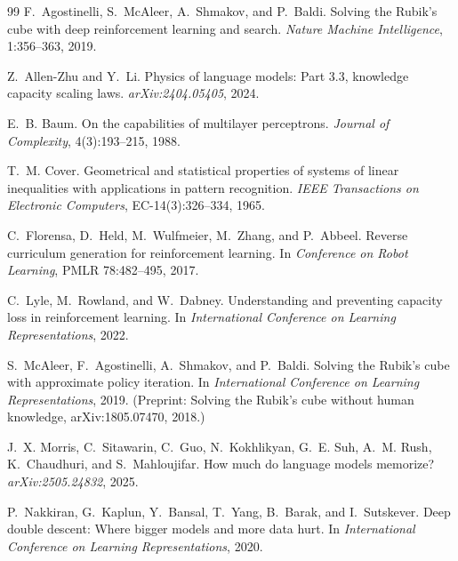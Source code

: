 \documentclass[11pt]{article}
\begin{document}

\begin{thebibliography}{99}
\providecommand{\natexlab}[1]{#1}
F.~Agostinelli, S.~McAleer, A.~Shmakov, and P.~Baldi.
\newblock Solving the Rubik's cube with deep reinforcement learning and search.
\newblock \emph{Nature Machine Intelligence}, 1:356--363, 2019.

Z.~Allen-Zhu and Y.~Li.
\newblock Physics of language models: Part 3.3, knowledge capacity scaling laws.
\newblock \emph{arXiv:2404.05405}, 2024.

E.~B. Baum.
\newblock On the capabilities of multilayer perceptrons.
\newblock \emph{Journal of Complexity}, 4(3):193--215, 1988.

T.~M. Cover.
\newblock Geometrical and statistical properties of systems of linear inequalities with applications in pattern recognition.
\newblock \emph{IEEE Transactions on Electronic Computers}, EC-14(3):326--334, 1965.

C.~Florensa, D.~Held, M.~Wulfmeier, M.~Zhang, and P.~Abbeel.
\newblock Reverse curriculum generation for reinforcement learning.
\newblock In \emph{Conference on Robot Learning}, PMLR 78:482--495, 2017.

C.~Lyle, M.~Rowland, and W.~Dabney.
\newblock Understanding and preventing capacity loss in reinforcement learning.
\newblock In \emph{International Conference on Learning Representations}, 2022.

S.~McAleer, F.~Agostinelli, A.~Shmakov, and P.~Baldi.
\newblock Solving the Rubik's cube with approximate policy iteration.
\newblock In \emph{International Conference on Learning Representations}, 2019. (Preprint: Solving the Rubik's cube without human knowledge, arXiv:1805.07470, 2018.)

J.~X. Morris, C.~Sitawarin, C.~Guo, N.~Kokhlikyan, G.~E. Suh, A.~M. Rush, K.~Chaudhuri, and S.~Mahloujifar.
\newblock How much do language models memorize?
\newblock \emph{arXiv:2505.24832}, 2025.

P.~Nakkiran, G.~Kaplun, Y.~Bansal, T.~Yang, B.~Barak, and I.~Sutskever.
\newblock Deep double descent: Where bigger models and more data hurt.
\newblock In \emph{International Conference on Learning Representations}, 2020.


\end{thebibliography}
\end{document}
